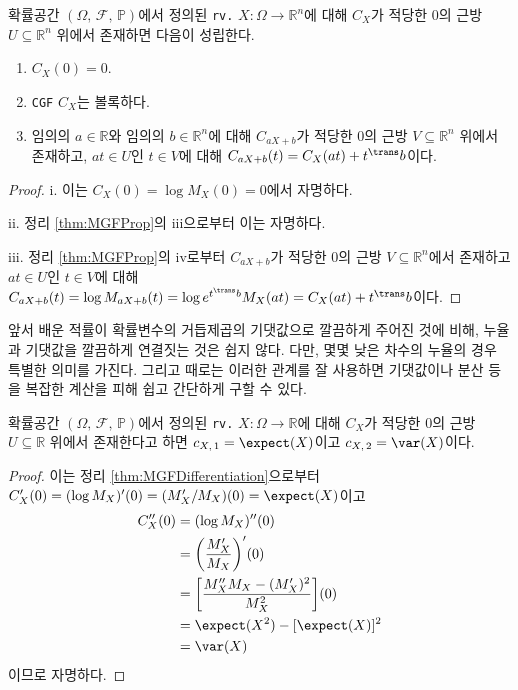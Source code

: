 \begin{theorem}\label{thm:CGFProp}
    확률공간 $(\Omega,\,\mathcal{F},\,\mathbb{P})$에서 정의된 \texttt{rv.} $X:\Omega\to\mathbb{R}^n$에 대해 $C_X$가 적당한 $0$의 근방 $U\subseteq\mathbb{R}^n$ 위에서 존재하면 다음이 성립한다.
    \begin{enumerate}
        \item $C_X(0)=0$.
        \item \texttt{CGF} $C_X$는 볼록하다.
        \item 임의의 $a\in\mathbb{R}$와 임의의 $b\in\mathbb{R}^n$에 대해 $C_{aX+b}$가 적당한 $0$의 근방 $V\subseteq\mathbb{R}^n$ 위에서 존재하고, $at\in U$인 $t\in V$에 대해 $C_{aX+b}(t)=C_X(at)+t^\trans b$이다.
    \end{enumerate}
\end{theorem}

\begin{proof}
    i. 이는 $C_X(0)=\log M_X(0)=0$에서 자명하다.

    ii. 정리 \ref{thm:MGFProp}의 iii으로부터 이는 자명하다.

    iii. 정리 \ref{thm:MGFProp}의 iv로부터 $C_{aX+b}$가 적당한 $0$의 근방 $V\subseteq\mathbb{R}^n$에서 존재하고 $at\in U$인 $t\in V$에 대해 $C_{aX+b}(t)=\log M_{aX+b}(t)=\log e^{t^\trans b}M_X(at)=C_X(at)+t^\trans b$이다.
\end{proof}

앞서 배운 적률이 확률변수의 거듭제곱의 기댓값으로 깔끔하게 주어진 것에 비해, 누율과 기댓값을 깔끔하게 연결짓는 것은 쉽지 않다. 다만, 몇몇 낮은 차수의 누율의 경우 특별한 의미를 가진다. 그리고 때로는 이러한 관계를 잘 사용하면 기댓값이나 분산 등을 복잡한 계산을 피해 쉽고 간단하게 구할 수 있다.

\begin{proposition}\label{prop:firstSecondCumulant}
    확률공간 $(\Omega,\,\mathcal{F},\,\mathbb{P})$에서 정의된 \texttt{rv.} $X:\Omega\to\mathbb{R}$에 대해 $C_X$가 적당한 $0$의 근방 $U\subseteq\mathbb{R}$ 위에서 존재한다고 하면 $c_{X,\,1}=\expect(X)$이고 $c_{X,\,2}=\var(X)$이다.
\end{proposition}

\begin{proof}
    이는 정리 \ref{thm:MGFDifferentiation}으로부터 $C_X'(0)=(\log M_X)'(0)=(M_X'/M_X)(0)=\expect(X)$이고
    \begin{align*}
        C_X''(0)&=(\log M_X)''(0)\\
        &=\bigg(\frac{M_X'}{M_X}\bigg)'(0)\\
        &=\bigg[\frac{M_X''M_X-(M_X')^2}{M_X^2}\bigg](0)\\
        &=\expect(X^2)-[\expect(X)]^2\\
        &=\var(X)
    \end{align*}
   이므로 자명하다.
\end{proof}

